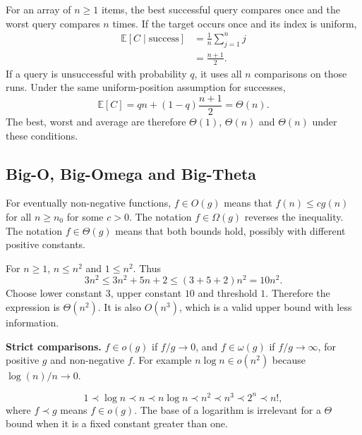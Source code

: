 \documentclass[12pt,a4paper]{article}
\begin{document}
\begin{tcolorbox}[examplebox, title={Linear search with successful and unsuccessful queries}]
For an array of $n\ge 1$ items, the best successful query compares once and the worst query compares $n$ times. If the target occurs once and its index is uniform,
\begin{align*}
\mathbb{E}[C\mid\text{success}]
  &= \frac{1}{n}\sum_{j=1}^{n}j\\
  &= \frac{n+1}{2}.
\end{align*}
If a query is unsuccessful with probability $q$, it uses all $n$ comparisons on those runs. Under the same uniform-position assumption for successes,
\[
\mathbb{E}[C]=qn+(1-q)\frac{n+1}{2}=\Theta(n).
\]
The best, worst and average are therefore $\Theta(1)$, $\Theta(n)$ and $\Theta(n)$ under these conditions.
\end{tcolorbox}

\subsection{Big-O, Big-Omega and Big-Theta}
\begin{tcolorbox}[defbox, title={Growth bounds}]
For eventually non-negative functions, $f\in O(g)$ means that $f(n)\le c g(n)$ for all $n\ge n_0$ for some $c>0$. The notation $f\in\Omega(g)$ reverses the inequality. The notation $f\in\Theta(g)$ means that both bounds hold, possibly with different positive constants.
\end{tcolorbox}

\begin{tcolorbox}[examplebox, title={Proving a tight bound with constants}]
For $n\ge1$, $n\le n^2$ and $1\le n^2$. Thus
\[
3n^2\le 3n^2+5n+2\le(3+5+2)n^2=10n^2.
\]
Choose lower constant $3$, upper constant $10$ and threshold $1$. Therefore the expression is $\Theta(n^2)$. It is also $O(n^3)$, which is a valid upper bound with less information.
\end{tcolorbox}

\textbf{Strict comparisons.} $f\in o(g)$ if $f/g\to0$, and $f\in\omega(g)$ if $f/g\to\infty$, for positive $g$ and non-negative $f$. For example $n\log n\in o(n^2)$ because $\log(n)/n\to0$.
\begin{tcolorbox}[formulabox, title={Common growth rates}]
\[
1 \prec \log n \prec n \prec n\log n
  \prec n^2 \prec n^3 \prec 2^n \prec n!,
\]
where $f\prec g$ means $f\in o(g)$. The base of a logarithm is irrelevant for a $\Theta$ bound when it is a fixed constant greater than one.
\end{tcolorbox}
\end{document}
